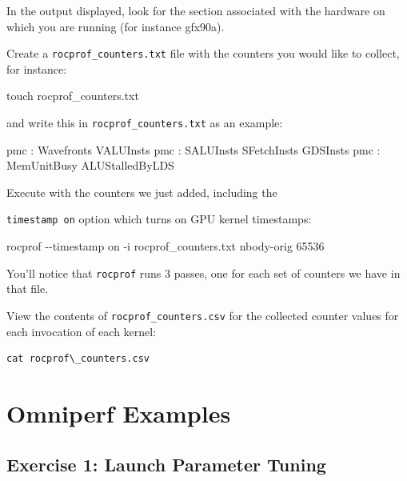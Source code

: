 \documentclass[
]{article}
\let\oldtexttt\texttt
\renewcommand{\texttt}[1]{
  \colorbox{Light}{\oldtexttt{#1}}
}
\newenvironment{Shaded}{}{}
\newcommand{\ExtensionTok}[1]{#1}
\newcommand{\FunctionTok}[1]{\textcolor[rgb]{0.02,0.16,0.49}{#1}}
\newcommand{\NormalTok}[1]{#1}
\begin{document}
In the output displayed, look for the section associated with the
hardware on which you are running (for instance gfx90a).

Create a \texttt{rocprof\_counters.txt} file with the counters you would
like to collect, for instance:

\begin{Shaded}
\begin{Highlighting}[]
\FunctionTok{touch}\NormalTok{ rocprof\_counters.txt}
\end{Highlighting}
\end{Shaded}

and write this in \texttt{rocprof\_counters.txt} as an example:

\begin{Shaded}
\begin{Highlighting}[]
\ExtensionTok{pmc}\NormalTok{ : Wavefronts VALUInsts}
\ExtensionTok{pmc}\NormalTok{ : SALUInsts SFetchInsts GDSInsts}
\ExtensionTok{pmc}\NormalTok{ : MemUnitBusy ALUStalledByLDS}
\end{Highlighting}
\end{Shaded}

Execute with the counters we just added, including the
\texttt{timestamp\ on} option which turns on GPU kernel timestamps:

\begin{Shaded}
\begin{Highlighting}[]
\ExtensionTok{rocprof}\NormalTok{ {-}{-}timestamp on {-}i rocprof\_counters.txt  nbody{-}orig 65536}
\end{Highlighting}
\end{Shaded}

You'll notice that \texttt{rocprof} runs 3 passes, one for each set of
counters we have in that file.

View the contents of \texttt{rocprof\_counters.csv} for the collected
counter values for each invocation of each kernel:

\begin{verbatim}
cat rocprof\_counters.csv
\end{verbatim}

\pagebreak

\hypertarget{omniperf-examples}{%
\section{Omniperf Examples}\label{omniperf-examples}}

\hypertarget{exercise-1-launch-parameter-tuning}{%
\subsection{Exercise 1: Launch Parameter
Tuning}\label{exercise-1-launch-parameter-tuning}}
\end{document}
